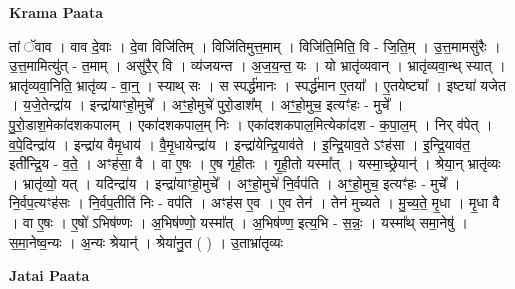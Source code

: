\documentclass[17pt]{extarticle}
\begin{document}
\textbf{Krama Paata} \newline

तां ॅवाव । वाव दे॒वाः । दे॒वा विजि॑तिम् । विजि॑तिमुत्त॒माम् । विजि॑ति॒मिति॒ वि - जि॒ति॒म् । उ॒त्त॒मामसु॑रैः । उ॒त्त॒मामित्यु॑त् - त॒माम् । असु॑रै॒र् वि । व्य॑जयन्त । अ॒ज॒य॒न्त॒ यः । यो भ्रातृ॑व्यवान् । भ्रातृ॑व्यवा॒न्थ् स्यात् । भ्रातृ॑व्यवा॒निति॒ भ्रातृ॑व्य - वा॒न्॒ । स्याथ् सः । स स्पर्द्ध॑मानः । स्पर्द्ध॑मान ए॒तया᳚ । ए॒तयेष्ट्या᳚ । इष्ट्या॑ यजेत । य॒जे॒तेन्द्रा॑य । इन्द्रा॑याꣳहो॒मुचे᳚ । अꣳ॒॒हो॒मुचे॑ पुरो॒डाश᳚म् । अꣳ॒॒हो॒मुच॒ इत्यꣳ॑हः - मुचे᳚ । पु॒रो॒डाश॒मेका॑दशकपालम् । एका॑दशकपाल॒म् निः । एका॑दशकपाल॒मित्येका॑दश - क॒पा॒ल॒म् । निर् व॑पेत् । व॒पे॒दिन्द्रा॑य । इन्द्रा॑य वैमृ॒धाय॑ । वै॒मृ॒धायेन्द्रा॑य । इन्द्रा॑येन्द्रि॒याव॑ते । इ॒न्द्रि॒याव॒ते ऽꣳह॑सा । इ॒न्द्रि॒याव॑त॒ इती᳚न्द्रि॒य - व॒ते॒ । अꣳह॑सा॒ वै । वा ए॒षः । ए॒ष गृ॑ही॒तः । गृ॒ही॒तो यस्मा᳚त् । यस्मा॒च्छ्रेयान्॑ । श्रेया॒न् भ्रातृ॑व्यः । भ्रातृ॑व्यो॒ यत् । यदिन्द्रा॑य । इन्द्रा॑याꣳहो॒मुचे᳚ । अꣳ॒॒हो॒मुचे॑ नि॒र्वप॑ति । अꣳ॒॒हो॒मुच॒ इत्यꣳ॑हः - मुचे᳚ । नि॒र्वप॒त्यꣳह॑सः । नि॒र्वप॒तीति॑ निः - वप॑ति । अꣳह॑स ए॒व । ए॒व तेन॑ । तेन॑ मुच्यते । मु॒च्य॒ते॒ मृ॒धा । मृ॒धा वै । वा ए॒षः । ए॒षो॑ ऽभिष॑ण्णः । अ॒भिष॑ण्णो॒ यस्मा᳚त् । अ॒भिष॑ण्ण॒ इत्य॒भि - स॒न्नः॒ । यस्मा᳚थ् समा॒नेषु॑ । स॒मा॒नेष्व॒न्यः । अ॒न्यः श्रेयान्॑ । श्रेया॑नु॒त ( ) । उ॒ताभ्रा॑तृव्यः \newline

\textbf{Jatai Paata} \newline
\end{document}
